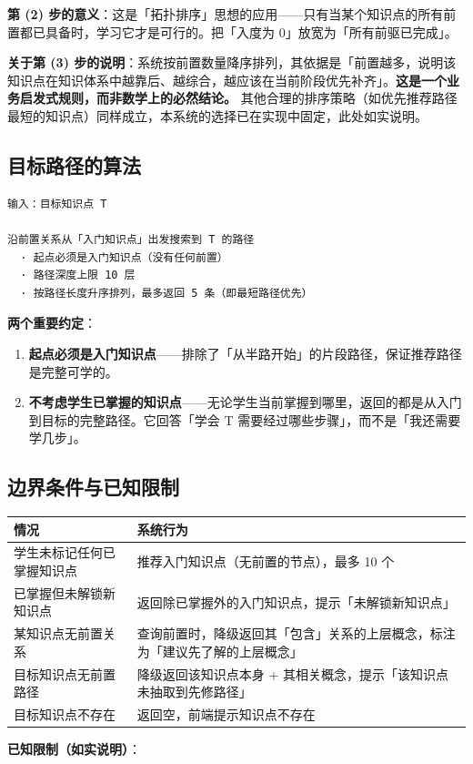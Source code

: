 \documentclass[UTF8,a4paper,11pt]{ctexrep}
\begin{document}
\textbf{第 (2) 步的意义}：这是「拓扑排序」思想的应用——只有当某个知识点的所有前置都已具备时，学习它才是可行的。把「入度为 0」放宽为「所有前驱已完成」。

\textbf{关于第 (3) 步的说明}：系统按前置数量降序排列，其依据是「前置越多，说明该知识点在知识体系中越靠后、越综合，越应该在当前阶段优先补齐」。\textbf{这是一个业务启发式规则，而非数学上的必然结论。} 其他合理的排序策略（如优先推荐路径最短的知识点）同样成立，本系统的选择已在实现中固定，此处如实说明。


\subsection{目标路径的算法}

\begin{Verbatim}[breaklines=true,breakanywhere=true,fontsize=\small,frame=single,framesep=4pt,rulecolor=\color{codeframe}]
输入：目标知识点 T

沿前置关系从「入门知识点」出发搜索到 T 的路径
  · 起点必须是入门知识点（没有任何前置）
  · 路径深度上限 10 层
  · 按路径长度升序排列，最多返回 5 条（即最短路径优先）
\end{Verbatim}

\textbf{两个重要约定}：

\begin{enumerate}
\item \textbf{起点必须是入门知识点}——排除了「从半路开始」的片段路径，保证推荐路径是完整可学的。
\item \textbf{不考虑学生已掌握的知识点}——无论学生当前掌握到哪里，返回的都是从入门到目标的完整路径。它回答「学会 T 需要经过哪些步骤」，而不是「我还需要学几步」。
\end{enumerate}

\subsection{边界条件与已知限制}

\begin{center}
\small
\begin{tabularx}{\linewidth}{@{}XX@{}}
\toprule
情况 & 系统行为 \\
\midrule
学生未标记任何已掌握知识点 & 推荐入门知识点（无前置的节点），最多 10 个 \\
已掌握但未解锁新知识点 & 返回除已掌握外的入门知识点，提示「未解锁新知识点」 \\
某知识点无前置关系 & 查询前置时，降级返回其「包含」关系的上层概念，标注为「建议先了解的上层概念」 \\
目标知识点无前置路径 & 降级返回该知识点本身 + 其相关概念，提示「该知识点未抽取到先修路径」 \\
目标知识点不存在 & 返回空，前端提示知识点不存在 \\
\bottomrule
\end{tabularx}
\end{center}
\textbf{已知限制（如实说明）}：
\end{document}
